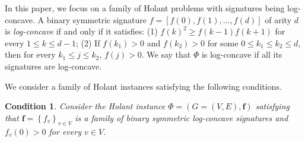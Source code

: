 \documentclass[11pt]{article}
\newtheorem{condition}{Condition}
\newcommand{\set}[1]{\left\{#1\right\}}
\newcommand{\vecf}{\boldsymbol{f}}
\newcommand{\qtodo}[1]{\todo[color = purple!40, size = \tiny]{\textbf{guoliang:} #1}}
\newcommand{\qgl}[1]{{\color{purple}{#1}}}
\begin{document}
In this paper, we focus on a family of Holant problems with signatures being log-concave. A binary symmetric signature $f = [f(0), f(1), \ldots, f(d)]$ of arity $d$ is \emph{log-concave} if and only if it satisfies: (1) $f(k)^2 \ge f(k - 1) f(k + 1)$ for every $1 \le k \le d - 1$; (2) If $f(k_1) > 0$ and $f(k_2) > 0$ for some $0 \le k_1 \le k_2 \le d$, then for every $k_1 \le j \le k_2$, $f(j) > 0$. We say that $\Phi$ is log-concave if all its signatures are log-concave. \qgl{state that the log-concave signature is powerful enough to express many counting problems.}

We consider a family of Holant instances satisfying the following conditions.
\begin{condition} \label{cond:Holant-condition}
    Consider the Holant instance $\Phi=(G= (V, E),\vecf)$ satisfying that $\vecf = \set{f_v}_{v \in V}$ is a family of binary symmetric log-concave signatures and $f_v(0) > 0$ for every $v \in V$.

\end{condition}

\end{document}
